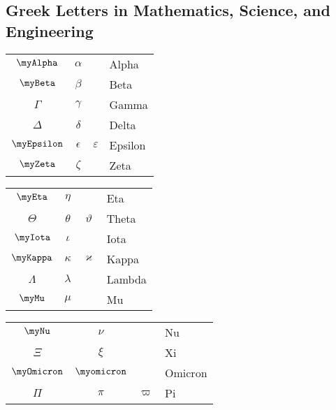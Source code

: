 \subsection{Greek Letters in Mathematics, Science, and Engineering}%
\label{sub:greek-alphabet-in-stem}


\begin{multicols}{4}
    \settowidth{\anonlength}{Digamma}
    \begin{tabular}{|ccc|p{\anonlength}|}
        \hline
        $\myAlpha   $ & $\alpha    $ &               & Alpha    \\
        $\myBeta    $ & $\beta     $ &               & Beta     \\
        $\Gamma     $ & $\gamma    $ &               & Gamma    \\
        $\Delta     $ & $\delta    $ &               & Delta    \\
        $\myEpsilon $ & $\epsilon  $ & $\varepsilon$ & Epsilon  \\
        $\myZeta    $ & $\zeta     $ &               & Zeta     \\
        \hline
    \end{tabular}
    \begin{tabular}{|ccc|p{\anonlength}|}
        \hline
        $\myEta     $ & $\eta      $ &               & Eta      \\
        $\Theta     $ & $\theta    $ & $\vartheta  $ & Theta    \\
        $\myIota    $ & $\iota     $ &               & Iota     \\
        $\myKappa   $ & $\kappa    $ & $\varkappa  $ & Kappa    \\
        $\Lambda    $ & $\lambda   $ &               & Lambda   \\
        $\myMu      $ & $\mu       $ &               & Mu       \\
        \hline
    \end{tabular}
    \begin{tabular}{|ccc|p{\anonlength}|}
        \hline
        $\myNu      $ & $\nu       $ &               & Nu       \\
        $\Xi        $ & $\xi       $ &               & Xi       \\
        $\myOmicron $ & $\myomicron$ &               & Omicron  \\
        $\Pi        $ & $\pi       $ & $\varpi     $ & Pi       \\

\end{tabular}
\end{multicols}
